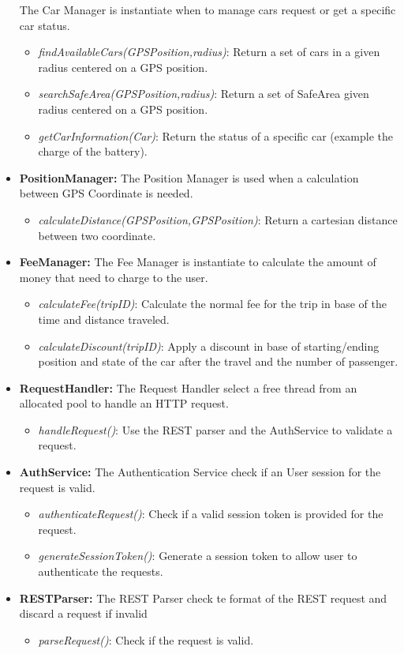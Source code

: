 \begin{itemize}
{	The Car Manager is instantiate when to manage cars request or get a specific car status.
	\begin{itemize}
		\item \textit{findAvailableCars(GPSPosition,radius)}: Return a set of cars in a given radius centered on a GPS position.
		\item \textit{searchSafeArea(GPSPosition,radius)}: Return a set of SafeArea given radius centered on a GPS position.
		\item \textit{getCarInformation(Car)}: Return the status of a specific car (example the charge of the battery).
	\end{itemize}
}
	\item{\textbf{PositionManager:}
	The Position Manager is used when a calculation between GPS Coordinate is needed.
	\begin{itemize}
		\item \textit{calculateDistance(GPSPosition,GPSPosition)}: Return a cartesian distance between two coordinate.
	\end{itemize}
}
	\item{\textbf{FeeManager:}
	The Fee Manager is instantiate to calculate the amount of money that need to charge to the user.
	\begin{itemize}
		\item \textit{calculateFee(tripID)}: Calculate the normal fee for the trip in base of the time and distance traveled.
		\item \textit{calculateDiscount(tripID)}: Apply a discount in base of starting/ending position and state of the car after the travel and the number of passenger.
	\end{itemize}
}

	\item{\textbf{RequestHandler:}
	The Request Handler select a free thread from an allocated pool to handle an HTTP request.
	\begin{itemize}
		\item \textit{handleRequest()}: Use the REST parser and the AuthService to validate a request.
	\end{itemize}
}

	\item{\textbf{AuthService:}
	The Authentication Service check if an User session for the request is valid.
	\begin{itemize}
		\item \textit{authenticateRequest()}: Check if a valid session token is provided for the request.
		\item \textit{generateSessionToken()}: Generate a session token to allow user to authenticate the requests.
	\end{itemize}
}
	\item{\textbf{RESTParser:}
	The REST Parser check te format of the REST request and discard a request if invalid
	\begin{itemize}
		\item \textit{parseRequest()}: Check if the request is valid.
	\end{itemize}
}
\end{itemize}

